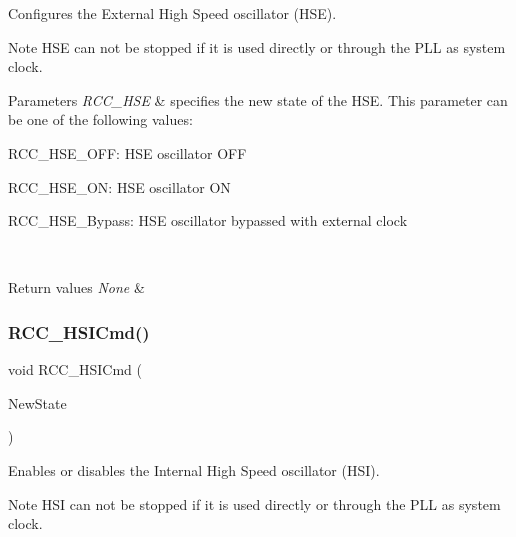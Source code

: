 Configures the External High Speed oscillator (H\+SE). 

\begin{DoxyNote}{Note}
H\+SE can not be stopped if it is used directly or through the P\+LL as system clock. 
\end{DoxyNote}

\begin{DoxyParams}{Parameters}
{\em R\+C\+C\+\_\+\+H\+SE} & specifies the new state of the H\+SE. This parameter can be one of the following values\+: \begin{DoxyItemize}
\item R\+C\+C\+\_\+\+H\+S\+E\+\_\+\+O\+FF\+: H\+SE oscillator O\+FF \item R\+C\+C\+\_\+\+H\+S\+E\+\_\+\+ON\+: H\+SE oscillator ON \item R\+C\+C\+\_\+\+H\+S\+E\+\_\+\+Bypass\+: H\+SE oscillator bypassed with external clock \end{DoxyItemize}
\\
\hline
\end{DoxyParams}

\begin{DoxyRetVals}{Return values}
{\em None} & \\
\hline
\end{DoxyRetVals}
\mbox{\label{group___r_c_c___exported___functions_ga0c6772a1e43765909495f57815ef69e2}} 
\subsubsection{\texorpdfstring{RCC\_HSICmd()}{RCC\_HSICmd()}}
{\footnotesize\ttfamily void R\+C\+C\+\_\+\+H\+S\+I\+Cmd (\begin{DoxyParamCaption}\item[{\mbox{\hyperlink{group___exported__types_gac9a7e9a35d2513ec15c3b537aaa4fba1}{Functional\+State}}}]{New\+State }\end{DoxyParamCaption})}



Enables or disables the Internal High Speed oscillator (H\+SI). 

\begin{DoxyNote}{Note}
H\+SI can not be stopped if it is used directly or through the P\+LL as system clock. 
\end{DoxyNote}

